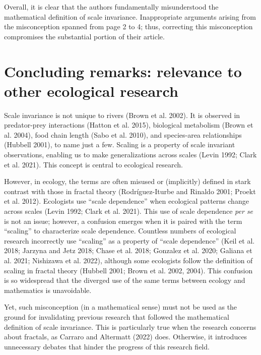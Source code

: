 \documentclass[
  12pt,
]{article}
\begin{document}
Overall, it is clear that the authors fundamentally misunderstood the mathematical definition of scale invariance. Inappropriate arguments arising from the misconception spanned from page 2 to 4; thus, correcting this misconception compromises the substantial portion of their article.

\hypertarget{concluding-remarks-relevance-to-other-ecological-research}{%
\section{Concluding remarks: relevance to other ecological research}\label{concluding-remarks-relevance-to-other-ecological-research}}

Scale invariance is not unique to rivers (Brown et al. 2002). It is observed in predator-prey interactions (Hatton et al. 2015), biological metabolism (Brown et al. 2004), food chain length (Sabo et al. 2010), and species-area relationships (Hubbell 2001), to name just a few. Scaling is a property of scale invariant observations, enabling us to make generalizations across scales (Levin 1992; Clark et al. 2021). This concept is central to ecological research.

However, in ecology, the terms are often misused or (implicitly) defined in stark contrast with those in fractal theory (Rodríguez-Iturbe and Rinaldo 2001; Proekt et al. 2012). Ecologists use ``scale dependence'' when ecological patterns change across scales (Levin 1992; Clark et al. 2021). This use of scale dependence \emph{per se} is not an issue; however, a confusion emerges when it is paired with the term ``scaling'' to characterize scale dependence. Countless numbers of ecological research incorrectly use ``scaling'' as a property of ``scale dependence'' (Keil et al. 2018; Jarzyna and Jetz 2018; Chase et al. 2018; Gonzalez et al. 2020; Galiana et al. 2021; Nishizawa et al. 2022), although some ecologists follow the definition of scaling in fractal theory (Hubbell 2001; Brown et al. 2002, 2004). This confusion is so widespread that the diverged use of the same terms between ecology and mathematics is unavoidable.

Yet, such misconception (in a mathematical sense) must not be used as the ground for invalidating previous research that followed the mathematical definition of scale invariance. This is particularly true when the research concerns about fractals, as Carraro and Altermatt (2022) does. Otherwise, it introduces unnecessary debates that hinder the progress of this research field.
\end{document}

